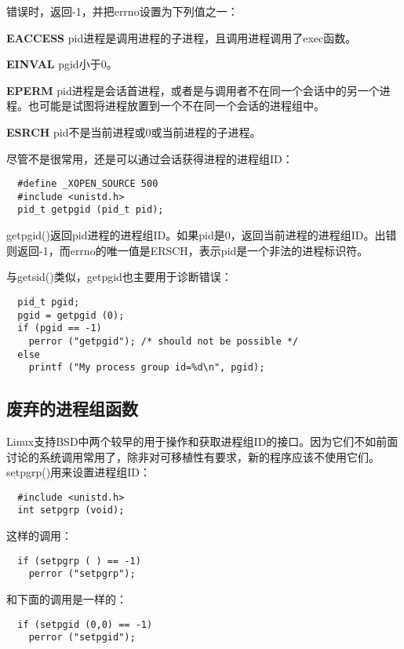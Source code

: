 错误时，返回-1，并把errno设置为下列值之一：

\begin{eqlist*}
\item[\textbf{EACCESS}] pid进程是调用进程的子进程，且调用进程调用了exec函数。
\item[\textbf{EINVAL}] pgid小于0。
\item[\textbf{EPERM}] pid进程是会话首进程，或者是与调用者不在同一个会话中的另一个进程。也可能是试图将进程放置到一个不在同一个会话的进程组中。
\item[\textbf{ESRCH}] pid不是当前进程或0或当前进程的子进程。
\end{eqlist*}

尽管不是很常用，还是可以通过会话获得进程的进程组ID：

\begin{lstlisting}
  #define _XOPEN_SOURCE 500
  #include <unistd.h>
  pid_t getpgid (pid_t pid);
\end{lstlisting}

getpgid()返回pid进程的进程组ID。如果pid是0，返回当前进程的进程组ID。出错则返回-1，而errno的唯一值是ERSCH，表示pid是一个非法的进程标识符。

与getsid()类似，getpgid也主要用于诊断错误：

\begin{lstlisting}
  pid_t pgid;
  pgid = getpgid (0);
  if (pgid == -1)
    perror ("getpgid"); /* should not be possible */
  else
    printf ("My process group id=%d\n", pgid);
\end{lstlisting}

\subsection{废弃的进程组函数}

Linux支持BSD中两个较早的用于操作和获取进程组ID的接口。因为它们不如前面讨论的系统调用常用了，除非对可移植性有要求，新的程序应该不使用它们。setpgrp()用来设置进程组ID：

\begin{lstlisting}
  #include <unistd.h>
  int setpgrp (void);
\end{lstlisting}

这样的调用：

\begin{lstlisting}
  if (setpgrp ( ) == -1)
    perror ("setpgrp");
\end{lstlisting}

和下面的调用是一样的：

\begin{lstlisting}
  if (setpgid (0,0) == -1)
    perror ("setpgid");
\end{lstlisting}

